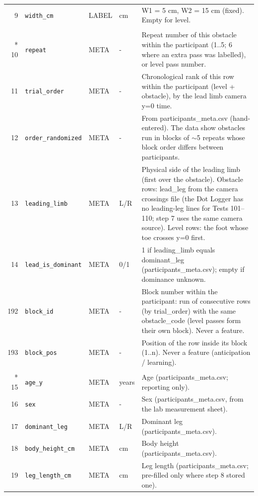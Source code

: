 \begin{longtable}{@{}r p{3.6cm} p{1.55cm} p{1.15cm} p{8.6cm}@{}}
9 & \texttt{width\_\allowbreak{}cm} & LABEL & cm & W1 = 5 cm, W2 = 15 cm (fixed). Empty for level. \\
\addlinespace
\multicolumn{5}{@{}l}{\textbf{Design and trial order (7)}} \\*
10 & \texttt{repeat} & META & - & Repeat number of this obstacle within the participant (1..5; 6 where an extra pass was labelled), or level pass number. \\
11 & \texttt{trial\_\allowbreak{}order} & META & - & Chronological rank of this row within the participant (level + obstacle), by the lead limb camera y=0 time. \\
12 & \texttt{order\_\allowbreak{}randomized} & META & - & From participants\_meta.csv (hand-entered). The data show obstacles run in blocks of $\sim$5 repeats whose block order differs between participants. \\
13 & \texttt{leading\_\allowbreak{}limb} & META & L/R & Physical side of the leading limb (first over the obstacle). Obstacle rows: lead\_leg from the camera crossings file (the Dot Logger has no leading-leg lines for Tests 101--110; step 7 uses the same camera source). Level rows: the foot whose toe crosses y=0 first. \\
14 & \texttt{lead\_\allowbreak{}is\_\allowbreak{}dominant} & META & 0/1 & 1 if leading\_limb equals dominant\_leg (participants\_meta.csv); empty if dominance unknown. \\
192 & \texttt{block\_\allowbreak{}id} & META & - & Block number within the participant: run of consecutive rows (by trial\_order) with the same obstacle\_code (level passes form their own block). Never a feature. \\
193 & \texttt{block\_\allowbreak{}pos} & META & - & Position of the row inside its block (1..n). Never a feature (anticipation / learning). \\
\addlinespace
\multicolumn{5}{@{}l}{\textbf{Participant (6)}} \\*
15 & \texttt{age\_\allowbreak{}y} & META & years & Age (participants\_meta.csv; reporting only). \\
16 & \texttt{sex} & META & - & Sex (participants\_meta.csv, from the lab measurement sheet). \\
17 & \texttt{dominant\_\allowbreak{}leg} & META & L/R & Dominant leg (participants\_meta.csv). \\
18 & \texttt{body\_\allowbreak{}height\_\allowbreak{}cm} & META & cm & Body height (participants\_meta.csv). \\
19 & \texttt{leg\_\allowbreak{}length\_\allowbreak{}cm} & META & cm & Leg length (participants\_meta.csv; pre-filled only where step 8 stored one). \\

\end{longtable}
